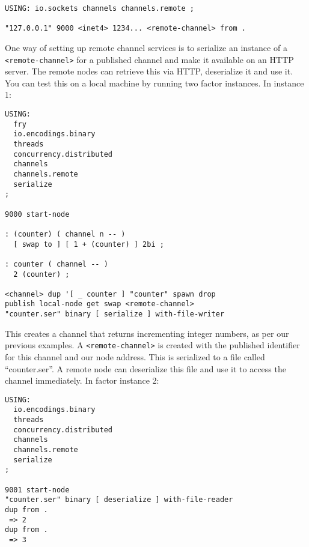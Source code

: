 \begin{verbatim}
USING: io.sockets channels channels.remote ;

"127.0.0.1" 9000 <inet4> 1234... <remote-channel> from .
\end{verbatim}

One way of setting up remote channel services is to serialize an instance of a \texttt{<remote-channel>} for a published channel and make it available on an HTTP server. The remote nodes can retrieve this via HTTP, deserialize it and use it. You can test this on a local machine by running two factor instances. In instance 1:

\begin{verbatim}
USING:
  fry 
  io.encodings.binary
  threads 
  concurrency.distributed 
  channels  
  channels.remote 
  serialize 
;

9000 start-node 

: (counter) ( channel n -- )
  [ swap to ] [ 1 + (counter) ] 2bi ;
    
: counter ( channel -- )
  2 (counter) ;    

<channel> dup '[ _ counter ] "counter" spawn drop 
publish local-node get swap <remote-channel>
"counter.ser" binary [ serialize ] with-file-writer
\end{verbatim}

This creates a channel that returns incrementing integer numbers, as per our previous examples. A \texttt{<remote-channel>} is created with the published identifier for this channel and our node address. This is serialized to a file called ``counter.ser''. A remote node can deserialize this file and use it to access the channel immediately. In factor instance 2:

\begin{verbatim}
USING: 
  io.encodings.binary
  threads 
  concurrency.distributed 
  channels 
  channels.remote 
  serialize 
;

9001 start-node 
"counter.ser" binary [ deserialize ] with-file-reader
dup from .
 => 2
dup from .
 => 3
\end{verbatim}
